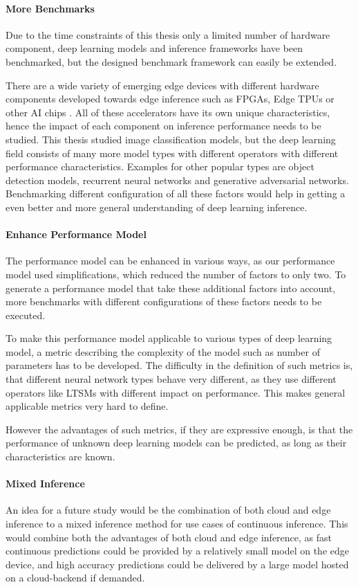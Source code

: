 \paragraph{More Benchmarks}
Due to the time constraints of this thesis only a limited number of hardware component, deep learning models and inference frameworks have been benchmarked, but the designed benchmark framework can easily be extended.


There are a wide variety of emerging edge devices with different hardware components developed towards edge inference such as FPGAs, Edge TPUs or other AI chips \cite{AItrends}.
All of these accelerators have its own unique characteristics, hence the impact of each component on inference performance needs to be studied.
This thesis studied image classification models, but the deep learning field consists of many more model types with different operators with different performance characteristics.
Examples for other popular types are object detection models, recurrent neural networks and generative adversarial networks.
Benchmarking different configuration of all these factors would help in getting a even better and more general understanding of deep learning inference.


\paragraph{Enhance Performance Model}
The performance model can be enhanced in various ways, as our performance model used simplifications, which reduced the number of factors to only two.
To generate a performance model that take these additional factors into account, more benchmarks with different configurations of these factors needs to be executed.

To make this performance model applicable to various types of deep learning model, a metric describing the complexity of the model such as number of parameters has to be developed.
The difficulty in the definition of such metrics is, that different neural network types behave very different, as they use different operators like LTSMs with different impact on performance. 
This makes general applicable metrics very hard to define.

However the advantages of such metrics, if they are expressive enough, is that the performance of unknown deep learning models can be predicted, as long as their characteristics are known.
\paragraph{Mixed Inference}
An idea for a future study would be the combination of both cloud and edge inference to a mixed inference method for use cases of continuous inference.
This would combine both the advantages of both cloud and edge inference, as fast continuous predictions could be provided by a relatively small model on the edge device, and high accuracy predictions could be delivered by a large model hosted on a cloud-backend if demanded. 

